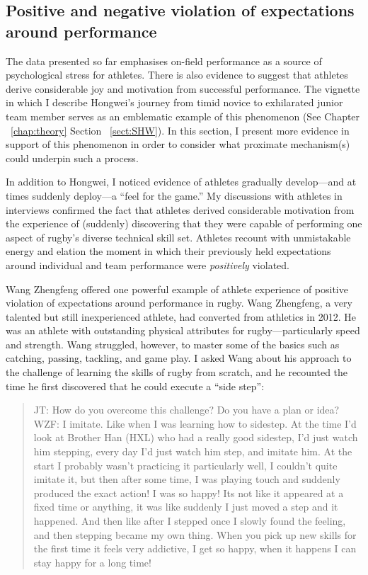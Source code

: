 \begin{CJK}{UTF8}{gbsn}
\subsection{Positive and negative violation of expectations around performance\label{sect:expectationViolation}}

The data presented so far emphasises on-field performance as a source of psychological stress for athletes. There is also evidence to suggest that athletes derive considerable joy and motivation from successful performance.  The vignette in which I describe Hongwei's journey from timid novice to exhilarated junior team member serves as an emblematic example of this phenomenon (See Chapter ~\ref{chap:theory} Section ~\ref{sect:SHW}).  In this section, I present more evidence in support of this phenomenon in order to consider what proximate mechanism(s) could underpin such a process.

In addition to Hongwei, I noticed evidence of athletes gradually develop---and at times suddenly deploy---a ``feel for the game.''  My discussions with athletes in interviews confirmed the fact that athletes derived considerable motivation from the experience of (suddenly) discovering that they were capable of performing one aspect of rugby's diverse technical skill set.  Athletes recount with unmistakable energy and elation the moment in which their previously held expectations around individual and team performance were \textit{positively} violated.

Wang Zhengfeng offered one powerful example of athlete experience of positive violation of expectations around performance in rugby.  Wang Zhengfeng, a very talented but still inexperienced athlete, had converted from athletics in 2012. He was an athlete with outstanding physical attributes for rugby---particularly speed and strength. Wang struggled, however, to master some of the basics such as catching,  passing, tackling, and game play.  I asked Wang about his approach to the challenge of learning the skills of rugby from scratch, and he recounted the time he first discovered that he could execute a ``side step'':

    \begin{quotation}
      JT: How do you overcome this challenge? Do you have a plan or idea? \\
      WZF: I imitate.  Like when I was learning how to sidestep. At the time I’d look at Brother Han (HXL) who had a really good sidestep, I'd just watch him stepping, every day I'd just watch him step, and imitate him.  At the start I probably wasn't practicing it particularly well, I couldn't quite imitate it, but then after some time, I was playing touch and suddenly produced the exact action! I was so happy! Its not like it appeared at a fixed time or anything, it was like suddenly I just moved a step and it happened. And then like after I stepped once I slowly found the feeling, and then stepping became my own thing.  When you pick up new skills for the first time it feels very addictive, I get so happy, when it happens I can stay happy for a long time!
    \end{quotation}


\end{CJK}
